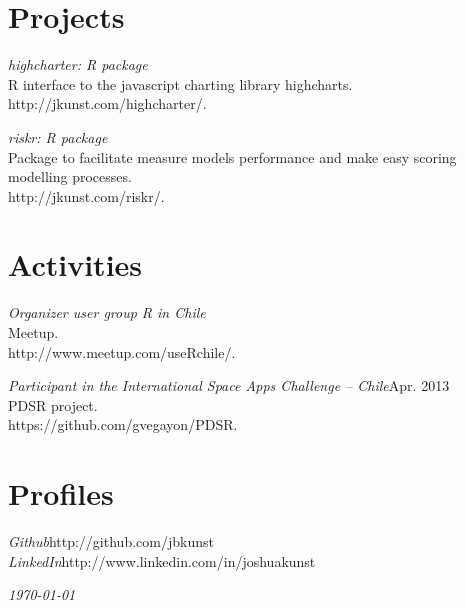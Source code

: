 \documentclass[margin]{res}
\begin{document}
\begin{resume}
\vspace{1cm}

\newpage

\section{Projects}


    {\sl highcharter: R package}\\
    R interface to the javascript charting library highcharts.\\
    http://jkunst.com/highcharter/.
    
    {\sl riskr: R package}\\
    Package to facilitate measure models performance and make easy scoring modelling processes.\\
    http://jkunst.com/riskr/.
    

\vspace{1cm}


\section{Activities}
    
    {\sl Organizer user group R in Chile}\\
    Meetup.\\
    http://www.meetup.com/useRchile/.
    
    {\sl Participant in the International Space Apps Challenge – Chile}\hfill Apr. 2013\\
    PDSR project.\\
    https://github.com/gvegayon/PDSR.

\vspace{1cm}

\section{Profiles}
    
    {\sl Github}\hfill http://github.com/jbkunst\\
    
    {\sl LinkedIn}\hfill http://www.linkedin.com/in/joshuakunst

\vspace{1cm}


\end{resume}

\vspace{0.5cm}

\hfill {\sl \today}
\end{document}
